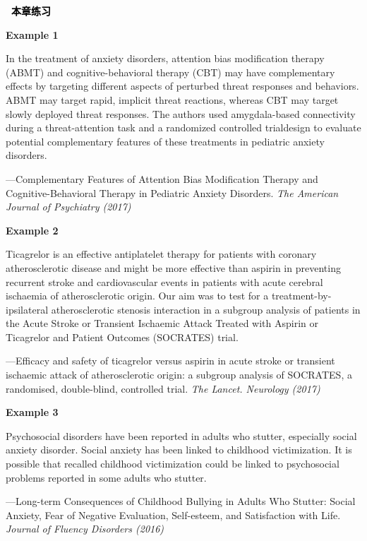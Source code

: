 \documentclass[a4paper]{ctexbook}
\newenvironment{problemset}[1][本章练习]{
  \begin{center}
    \phantomsection\addcontentsline{toc}{section}{\texorpdfstring{本章练习}{Exercice}}
    \markright{#1}
    \textcolor{black}{\Large\bfseries\adftripleflourishleft~#1~\adftripleflourishright}
  \end{center}
  \begin{enumerate}}{
  \end{enumerate}}
\begin{document}
\begin{problemset}
  \textbf{Example 1}

  \hspace*{2em}In the treatment of anxiety disorders, attention bias modification therapy (ABMT) and cognitive-behavioral therapy (CBT) may have complementary effects by targeting different aspects of perturbed threat responses and behaviors. ABMT may target rapid, implicit threat reactions, whereas CBT may target slowly deployed threat responses. The authors used amygdala-based connectivity during a threat-attention task and a randomized controlled trialdesign to evaluate potential complementary features of these treatments in pediatric anxiety disorders.

  \begin{flushright}
    ---Complementary Features of Attention Bias Modification Therapy and Cognitive-Behavioral Therapy in Pediatric Anxiety Disorders. \emph{The American Journal of Psychiatry (2017)}
  \end{flushright}

  \textbf{Example 2}

  \hspace*{2em}Ticagrelor is an effective antiplatelet therapy for patients with coronary atherosclerotic disease and might be more effective than aspirin in preventing recurrent stroke and cardiovascular events in patients with acute cerebral ischaemia of atherosclerotic origin. Our aim was to test for a treatment-by-ipsilateral atherosclerotic stenosis interaction in a subgroup analysis of patients in the Acute Stroke or Transient Ischaemic Attack Treated with Aspirin or Ticagrelor and Patient Outcomes (SOCRATES) trial.

  \begin{flushright}
    ---Efficacy and safety of ticagrelor versus aspirin in acute stroke or transient ischaemic attack of atherosclerotic origin: a subgroup analysis of SOCRATES, a randomised, double-blind, controlled trial. \emph{The Lancet. Neurology (2017)}
  \end{flushright}

  \textbf{Example 3}

  \hspace*{2em}Psychosocial disorders have been reported in adults who stutter, especially social anxiety disorder. Social anxiety has been linked to childhood victimization. It is possible that recalled childhood victimization could be linked to psychosocial problems reported in some adults who stutter.

  \begin{flushright}
    ---Long-term Consequences of Childhood Bullying in Adults Who Stutter: Social Anxiety, Fear of Negative Evaluation, Self-esteem, and Satisfaction with Life. \emph{Journal of Fluency Disorders (2016)}
  \end{flushright}


\end{problemset}
\end{document}

